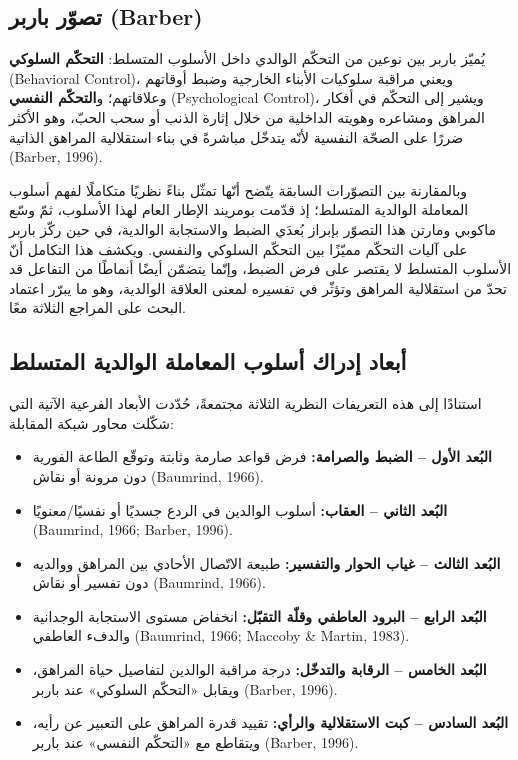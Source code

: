 \documentclass[12pt,oneside]{report}
\newcommand{\en}[1]{\textenglish{#1}}
\begin{document}
\subsection{تصوّر باربر (Barber)}
يُميّز باربر بين نوعين من التحكّم الوالدي داخل الأسلوب المتسلط: \textbf{التحكّم السلوكي}
\en{(Behavioral Control)}، ويعني مراقبة سلوكيات الأبناء الخارجية وضبط أوقاتهم وعلاقاتهم؛
و\textbf{التحكّم النفسي} \en{(Psychological Control)}، ويشير إلى التحكّم في أفكار المراهق ومشاعره
وهويته الداخلية من خلال إثارة الذنب أو سحب الحبّ، وهو الأكثر ضررًا على الصحّة النفسية لأنّه يتدخّل
مباشرةً في بناء استقلالية المراهق الذاتية \en{(Barber, 1996)}.

وبالمقارنة بين التصوّرات السابقة يتّضح أنّها تمثّل بناءً نظريًا متكاملًا لفهم أسلوب المعاملة الوالدية
المتسلط؛ إذ قدّمت بومريند الإطار العام لهذا الأسلوب، ثمّ وسّع ماكوبي ومارتن هذا التصوّر بإبراز بُعدَي
الضبط والاستجابة الوالدية، في حين ركّز باربر على آليات التحكّم مميّزًا بين التحكّم السلوكي والنفسي.
ويكشف هذا التكامل أنّ الأسلوب المتسلط لا يقتصر على فرض الضبط، وإنّما يتضمّن أيضًا أنماطًا من
التفاعل قد تحدّ من استقلالية المراهق وتؤثّر في تفسيره لمعنى العلاقة الوالدية، وهو ما يبرّر اعتماد البحث
على المراجع الثلاثة معًا.

\subsection{أبعاد إدراك أسلوب المعاملة الوالدية المتسلط}
استنادًا إلى هذه التعريفات النظرية الثلاثة مجتمعةً، حُدّدت الأبعاد الفرعية الآتية التي شكّلت محاور شبكة
المقابلة:
\begin{itemize}[leftmargin=1.6em,itemsep=1pt]
\item \textbf{البُعد الأول -- الضبط والصرامة:} فرض قواعد صارمة وثابتة وتوقّع الطاعة الفورية دون مرونة
أو نقاش \en{(Baumrind, 1966)}.
\item \textbf{البُعد الثاني -- العقاب:} أسلوب الوالدين في الردع جسديًا أو نفسيًا/معنويًا
\en{(Baumrind, 1966; Barber, 1996)}.
\item \textbf{البُعد الثالث -- غياب الحوار والتفسير:} طبيعة الاتّصال الأحادي بين المراهق ووالديه دون
تفسير أو نقاش \en{(Baumrind, 1966)}.
\item \textbf{البُعد الرابع -- البرود العاطفي وقلّة التقبّل:} انخفاض مستوى الاستجابة الوجدانية والدفء
العاطفي \en{(Baumrind, 1966; Maccoby \& Martin, 1983)}.
\item \textbf{البُعد الخامس -- الرقابة والتدخّل:} درجة مراقبة الوالدين لتفاصيل حياة المراهق، ويقابل
«التحكّم السلوكي» عند باربر \en{(Barber, 1996)}.
\item \textbf{البُعد السادس -- كبت الاستقلالية والرأي:} تقييد قدرة المراهق على التعبير عن رأيه، ويتقاطع
مع «التحكّم النفسي» عند باربر \en{(Barber, 1996)}.
\end{itemize}
\end{document}
